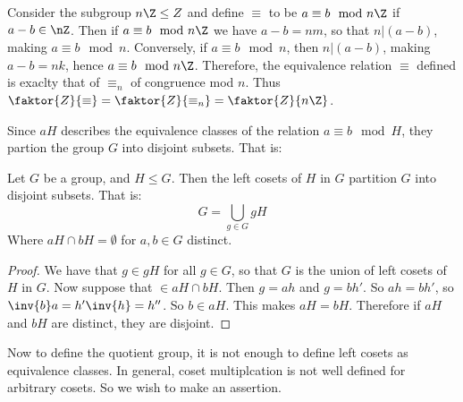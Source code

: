 \begin{example}\label{3.3}
    Consider the subgroup $n\Z \leq Z$ and define  $\equiv$ to be $a \equiv b
    \mod{n\Z}$ if $a-b \in \nZ$. Then if  $a \equiv b \mod{n\Z}$ we have
    $a-b=nm$, so that  $n|(a-b)$, making $a \equiv b \mod{n}$. Conversely, if $a
    \equiv b \mod{n}$, then $n|(a-b)$, making $a-b=nk$, hence  $a \equiv b
    \mod{n\Z}$. Therefore, the equivalence relation $\equiv$ defined is exaclty
    that of $\equiv_n$ of congruence mod $n$. Thus
    $\faktor{Z}{\equiv}=\faktor{Z}{\equiv_n}=\faktor{Z}{n\Z}$.
\end{example}

Since $aH$ describes the equivalence classes of the relation  $a \equiv b
\mod{H}$, they partion the group $G$ into disjoint subsets. That is:

 \begin{theorem}\label{3.2.2}
     Let $G$ be a group, and  $H \leq G$. Then the left cosets of $H$ in $G$
     partition $G$ into disjoint subsets. That is:
     \begin{equation}
         G = \bigcup_{g \in G}{gH}
     \end{equation}
     Where $aH \cap bH=\emptyset$ for  $a,b \in G$ distinct.
\end{theorem}
\begin{proof}
    We have that $g \in gH$ for all $g \in G$, so that  $G$ is the union of left
    cosets of  $H$ in  $G$. Now suppose that $ \in aH \cap bH$. Then  $g=ah$ and
     $g=bh'$. So $ah=bh'$, so  $\inv{b}a = h'\inv{h}=h''$. So $b \in aH$. This
     makes $aH=bH$. Therefore if $aH$ and $bH$ are distinct, they are disjoint.
\end{proof}

Now to define the quotient group, it is not enough to define left cosets as
equivalence classes. In general, coset multiplcation is not well defined for
arbitrary cosets. So we wish to make an assertion.

